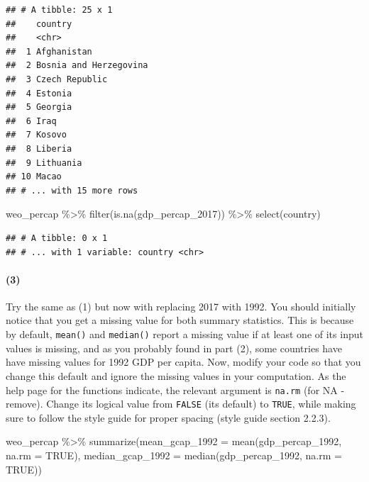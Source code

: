 \documentclass[11pt]{article}
\newcommand{\code}[1]{\colorbox{light-gray}{\texttt{#1}}}
\newenvironment{Shaded}{\begin{snugshade}}{\end{snugshade}}
\newcommand{\AttributeTok}[1]{\textcolor[rgb]{0.77,0.63,0.00}{#1}}
\newcommand{\ConstantTok}[1]{\textcolor[rgb]{0.00,0.00,0.00}{#1}}
\newcommand{\FunctionTok}[1]{\textcolor[rgb]{0.00,0.00,0.00}{#1}}
\newcommand{\NormalTok}[1]{#1}
\newcommand{\SpecialCharTok}[1]{\textcolor[rgb]{0.00,0.00,0.00}{#1}}
\begin{document}
\begin{verbatim}
## # A tibble: 25 x 1
##    country               
##    <chr>                 
##  1 Afghanistan           
##  2 Bosnia and Herzegovina
##  3 Czech Republic        
##  4 Estonia               
##  5 Georgia               
##  6 Iraq                  
##  7 Kosovo                
##  8 Liberia               
##  9 Lithuania             
## 10 Macao                 
## # ... with 15 more rows
\end{verbatim}

\begin{Shaded}
\begin{Highlighting}[]
\NormalTok{weo\_percap }\SpecialCharTok{\%\textgreater{}\%}
  \FunctionTok{filter}\NormalTok{(}\FunctionTok{is.na}\NormalTok{(gdp\_percap\_2017)) }\SpecialCharTok{\%\textgreater{}\%}
  \FunctionTok{select}\NormalTok{(country)}
\end{Highlighting}
\end{Shaded}

\begin{verbatim}
## # A tibble: 0 x 1
## # ... with 1 variable: country <chr>
\end{verbatim}

\paragraph{(3)}

Try the same as (1) but now with replacing 2017 with 1992. You should
initially notice that you get a missing value for both summary
statistics. This is because by default, \code{mean()} and
\code{median()} report a missing value if at least one of its input
values is missing, and as you probably found in part (2), some countries
have have missing values for 1992 GDP per capita. Now, modify your code
so that you change this default and ignore the missing values in your
computation. As the help page for the functions indicate, the relevant
argument is \code{na.rm} (for NA - remove). Change its logical value
from \code{FALSE} (its default) to \code{TRUE}, while making sure to
follow the style guide for proper spacing (style guide section 2.2.3).

\begin{Shaded}
\begin{Highlighting}[]
\NormalTok{weo\_percap }\SpecialCharTok{\%\textgreater{}\%}
  \FunctionTok{summarize}\NormalTok{(}\AttributeTok{mean\_gcap\_1992 =} \FunctionTok{mean}\NormalTok{(gdp\_percap\_1992, }\AttributeTok{na.rm =} \ConstantTok{TRUE}\NormalTok{),}
            \AttributeTok{median\_gcap\_1992 =} \FunctionTok{median}\NormalTok{(gdp\_percap\_1992, }\AttributeTok{na.rm =} \ConstantTok{TRUE}\NormalTok{))}
\end{Highlighting}
\end{Shaded}
\end{document}
